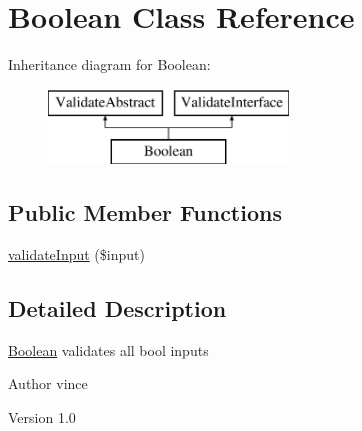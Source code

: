 \hypertarget{class_anemo_1_1_validate_1_1_adapter_1_1_boolean}{
\section{Boolean Class Reference}
\label{class_anemo_1_1_validate_1_1_adapter_1_1_boolean}
}
Inheritance diagram for Boolean:\begin{figure}[H]
\begin{center}
\leavevmode
\includegraphics[height=2.000000cm]{class_anemo_1_1_validate_1_1_adapter_1_1_boolean}
\end{center}
\end{figure}
\subsection*{Public Member Functions}
\begin{DoxyCompactItemize}
\item 
\hyperlink{class_anemo_1_1_validate_1_1_adapter_1_1_boolean_aaa5a5ce40dbb70cc1caa4482c0b7aa33}{validateInput} (\$input)
\end{DoxyCompactItemize}


\subsection{Detailed Description}
\hyperlink{class_anemo_1_1_validate_1_1_adapter_1_1_boolean}{Boolean} validates all bool inputs \begin{DoxyAuthor}{Author}
vince 
\end{DoxyAuthor}
\begin{DoxyVersion}{Version}
1.0 
\end{DoxyVersion}


